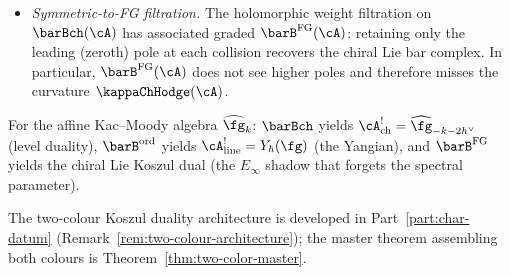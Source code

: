 \begin{remark}
\begin{itemize}[nosep]
\item \emph{Symmetric-to-FG filtration.} The holomorphic weight
 filtration on $\barBch(\cA)$ has associated graded
 $\barB^{\mathrm{FG}}(\cA)$: retaining only the leading
 (zeroth) pole at each collision recovers the chiral Lie bar
 complex. In particular, $\barB^{\mathrm{FG}}(\cA)$ does not
 see higher poles and therefore misses the curvature
 $\kappaChHodge(\cA)$.
\end{itemize}
For the affine Kac--Moody algebra $\widehat{\fg}_k$:
$\barBch$ yields $\cA^!_{\mathrm{ch}} =
\widehat{\fg}_{-k-2h^\vee}$ (level duality),
$\barB^{\mathrm{ord}}$ yields $\cA^!_{\mathrm{line}} =
Y_\hbar(\fg)$ (the Yangian), and $\barB^{\mathrm{FG}}$ yields
the chiral Lie Koszul dual (the $E_\infty$ shadow that forgets
the spectral parameter).

The two-colour Koszul duality architecture is developed in
Part~\ref{part:char-datum}
(Remark~\ref{rem:two-colour-architecture}); the master theorem
assembling both colours is
Theorem~\ref{thm:two-color-master}.
\end{remark}

